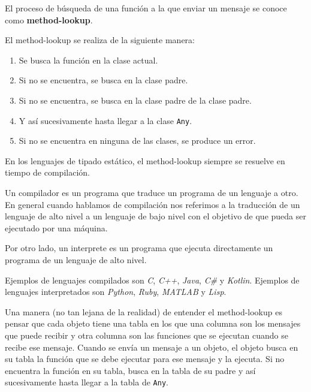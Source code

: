   \begin{defaultbox}
    El proceso de búsqueda de una función a la que enviar un mensaje se conoce como 
    \textbf{method-lookup}.

    El method-lookup se realiza de la siguiente manera:
    \begin{enumerate}
      \item Se busca la función en la clase actual.
      \item Si no se encuentra, se busca en la clase padre.
      \item Si no se encuentra, se busca en la clase padre de la clase padre.
      \item Y así sucesivamente hasta llegar a la clase \texttt{Any}.
      \item Si no se encuentra en ninguna de las clases, se produce un error.
    \end{enumerate}
    
    En los lenguajes de tipado estático, el method-lookup siempre se resuelve en tiempo de 
    compilación.
  \end{defaultbox}

  \begin{note}
    Un compilador es un programa que traduce un programa de un lenguaje a otro.
    En general cuando hablamos de compilación nos referimos a la traducción de un lenguaje de alto 
    nivel a un lenguaje de bajo nivel con el objetivo de que pueda ser ejecutado por una máquina.
    
    Por otro lado, un interprete es un programa que ejecuta directamente un programa de un lenguaje
    de alto nivel.

    Ejemplos de lenguajes compilados son \textit{C}, \textit{C++}, \textit{Java}, \textit{C\#} y
    \textit{Kotlin}.
    Ejemplos de lenguajes interpretados son \textit{Python}, \textit{Ruby}, \textit{MATLAB} y
    \textit{Lisp}.
  \end{note}

  Una manera (no tan lejana de la realidad) de entender el method-lookup es pensar que cada objeto
  tiene una tabla en los que una columna son los mensajes que puede recibir y otra columna son las
  funciones que se ejecutan cuando se recibe ese mensaje.
  Cuando se envía un mensaje a un objeto, el objeto busca en su tabla la función que se debe
  ejecutar para ese mensaje y la ejecuta.
  Si no encuentra la función en su tabla, busca en la tabla de su padre y así sucesivamente hasta
  llegar a la tabla de \texttt{Any}.
  
